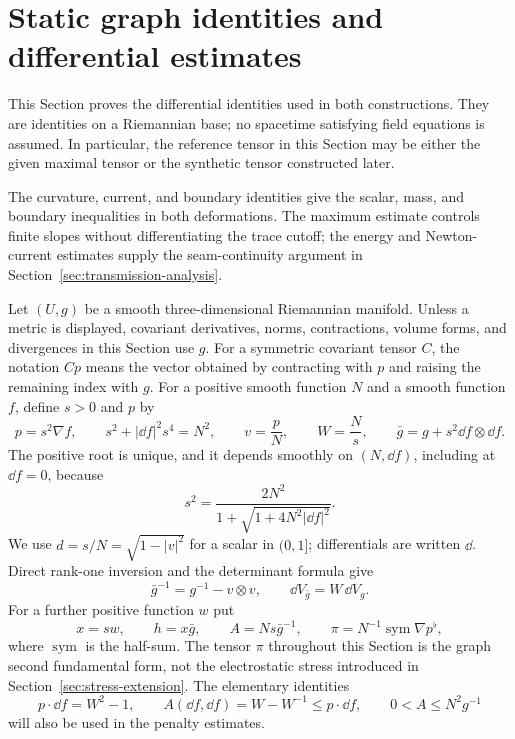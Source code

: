 \section{Static graph identities and differential estimates}
\label{sec:graph-calculus}

This Section proves the differential identities used in both constructions.
They are identities on a Riemannian base; no spacetime satisfying field
equations is assumed.  In particular, the reference tensor in this Section
may be either the given maximal tensor or the synthetic tensor constructed
later.

The curvature, current, and boundary identities give the scalar, mass,
and boundary inequalities in both deformations. The maximum estimate
controls finite slopes without differentiating the trace cutoff; the
energy and Newton-current estimates supply the seam-continuity argument
in Section~\ref{sec:transmission-analysis}.

Let $(U,g)$ be a smooth three-dimensional Riemannian manifold.  Unless a
metric is displayed, covariant derivatives, norms, contractions, volume
forms, and divergences in this Section use $g$.  For a symmetric covariant
tensor $C$, the notation $C p$ means the vector obtained by contracting with
$p$ and raising the remaining index with $g$.  For a positive smooth
function $N$ and a smooth function $f$, define $s>0$ and $p$ by
\begin{equation}
 p=s^2\nabla f,\qquad s^2+|\dd f|^2s^4=N^2,
 \qquad v=\frac pN,\qquad W=\frac Ns,
 \qquad \bar g=g+s^2\dd f\otimes\dd f.
 \label{eq:calculus-constitutive}
\end{equation}
The positive root is unique, and it depends smoothly on $(N,\dd f)$,
including at $\dd f=0$, because
\begin{equation}
 s^2=\frac{2N^2}{1+\sqrt{1+4N^2|\dd f|^2}}.
 \label{eq:calculus-positive-root}
\end{equation}
We use $d=s/N=\sqrt{1-|v|^2}$ for a scalar in $(0,1]$; differentials are
written $\dd$.  Direct rank-one inversion and the determinant formula give
\begin{equation}
 \bar g^{-1}=g^{-1}-v\otimes v,\qquad
 \dd V_{\bar g}=W\,\dd V_g.
 \label{eq:calculus-volume-inverse}
\end{equation}
For a further positive function $w$ put
\begin{equation}
 x=sw,\qquad h=x\bar g,\qquad A=Ns\bar g^{-1},
 \qquad \pi=N^{-1}\operatorname{sym}\nabla p^\flat,
 \label{eq:calculus-conformal-definitions}
\end{equation}
where $\operatorname{sym}$ is the half-sum.  The tensor $\pi$ throughout
this Section is the graph second fundamental form, not the electrostatic
stress introduced in Section~\ref{sec:stress-extension}.  The elementary
identities
\begin{equation}
 p\cdot\dd f=W^2-1,\qquad
 A(\dd f,\dd f)=W-W^{-1}\le p\cdot\dd f,
 \qquad 0<A\le N^2g^{-1}
 \label{eq:calculus-energy-algebra}
\end{equation}
will also be used in the penalty estimates.

